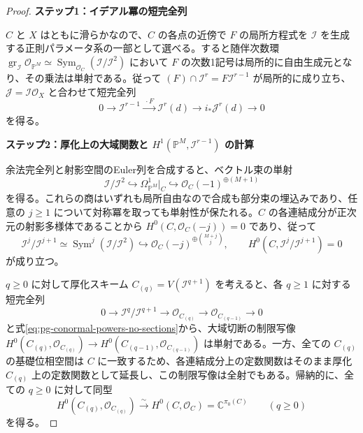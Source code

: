 \begin{proof}
\par\medskip\noindent\textbf{ステップ1：イデアル冪の短完全列}\par\nobreak\smallskip
$C$ と $X$ はともに滑らかなので、$C$ の各点の近傍で $F$ の局所方程式を $\mathcal I$ を生成する正則パラメータ系の一部として選べる。すると随伴次数環 $\operatorname{gr}_{\mathcal I}\mathcal O_{\mathbb P^M}\simeq\operatorname{Sym}_{\mathcal O_C}(\mathcal I/\mathcal I^2)$ において $F$ の次数1記号は局所的に自由生成元となり、その乗法は単射である。従って $(F)\cap\mathcal I^r=F\mathcal I^{r-1}$ が局所的に成り立ち、$\mathcal J=\mathcal I\mathcal O_X$ と合わせて短完全列
\begin{equation}\label{eq:pg-split-lifting-sequence}
 0\longrightarrow\mathcal I^{r-1}
 \xrightarrow{\ \cdot F\ }\mathcal I^r(d)
 \longrightarrow i_*\mathcal J^r(d)\longrightarrow0
\end{equation}
を得る。

\par\medskip\noindent\textbf{ステップ2：厚化上の大域関数と $H^1(\mathbb P^M,\mathcal I^{r-1})$ の計算}\par\nobreak\smallskip
余法完全列と射影空間のEuler列を合成すると、ベクトル束の単射
\begin{equation}
 \mathcal I/\mathcal I^2
 \hookrightarrow\Omega^1_{\mathbb P^M}|_C
 \hookrightarrow\mathcal O_C(-1)^{\oplus(M+1)}
\end{equation}
を得る。これらの商はいずれも局所自由なので合成も部分束の埋込みであり、任意の $j\ge1$ について対称冪を取っても単射性が保たれる。$C$ の各連結成分が正次元の射影多様体であることから $H^0(C,\mathcal O_C(-j))=0$ であり、従って
\begin{equation}\label{eq:pg-conormal-powers-no-sections}
 \mathcal I^j/\mathcal I^{j+1}
 \simeq\operatorname{Sym}^j(\mathcal I/\mathcal I^2)
 \hookrightarrow\mathcal O_C(-j)^{\oplus\binom{M+j}{j}},
 \qquad H^0(C,\mathcal I^j/\mathcal I^{j+1})=0
\end{equation}
が成り立つ。

$q\ge0$ に対して厚化スキーム $C_{(q)}=V(\mathcal I^{q+1})$ を考えると、各 $q\ge1$ に対する短完全列
\[
  0\longrightarrow\mathcal I^q/\mathcal I^{q+1}
  \longrightarrow\mathcal O_{C_{(q)}}
  \longrightarrow\mathcal O_{C_{(q-1)}}\longrightarrow0
\]
と式\eqref{eq:pg-conormal-powers-no-sections}から、大域切断の制限写像 $H^0(C_{(q)},\mathcal O_{C_{(q)}})\to H^0(C_{(q-1)},\mathcal O_{C_{(q-1)}})$ は単射である。一方、全ての $C_{(q)}$ の基礎位相空間は $C$ に一致するため、各連結成分上の定数関数はそのまま厚化 $C_{(q)}$ 上の定数関数として延長し、この制限写像は全射でもある。帰納的に、全ての $q\ge0$ に対して同型
\begin{equation}\label{eq:pg-thickening-global-functions}
 H^0(C_{(q)},\mathcal O_{C_{(q)}})
 \xrightarrow{\sim} H^0(C,\mathcal O_C)
 =\mathbb C^{\pi_0(C)}\qquad(q\ge0)
\end{equation}
を得る。


\end{proof}
